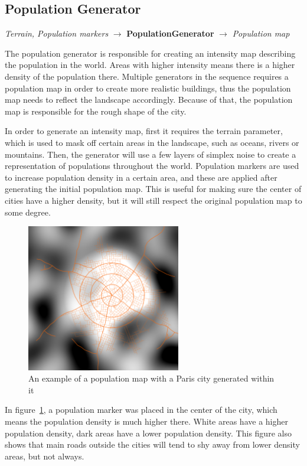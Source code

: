 \subsection{Population Generator}
\begin{center}
    \textit{Terrain, Population markers} $\rightarrow$ \textbf{PopulationGenerator} $\rightarrow$ \textit{Population map} 
\end{center}
The population generator is responsible for creating an intensity map describing the population in the world.
Areas with higher intensity means there is a higher density of the population there.
Multiple generators in the sequence requires a population map in order to create more realistic buildings, thus the population map needs to reflect the landscape accordingly.
Because of that, the population map is responsible for the rough shape of the city.

In order to generate an intensity map, first it requires the terrain parameter, which is used to mask off certain areas in the landscape, such as oceans, rivers or mountains.
Then, the generator will use a few layers of simplex noise to create a representation of populations throughout the world.
Population markers are used to increase population density in a certain area, and these are applied after generating the initial population map.
This is useful for making sure the center of cities have a higher density, but it will still respect the original population map to some degree.

\begin{figure}[h]
  \centering
  \includegraphics[width=0.6\textwidth]{figure/gen_population_map.png}
  \caption{An example of a population map with a Paris city generated within it}
  \label{fig:gen_population_map_example}
\end{figure}

In figure~\ref{fig:gen_population_map_example}, a population marker was placed in the center of the city, which means the population density is much higher there.
White areas have a higher population density, dark areas have a lower population density.
This figure also shows that main roads outside the cities will tend to shy away from lower density areas, but not always.
